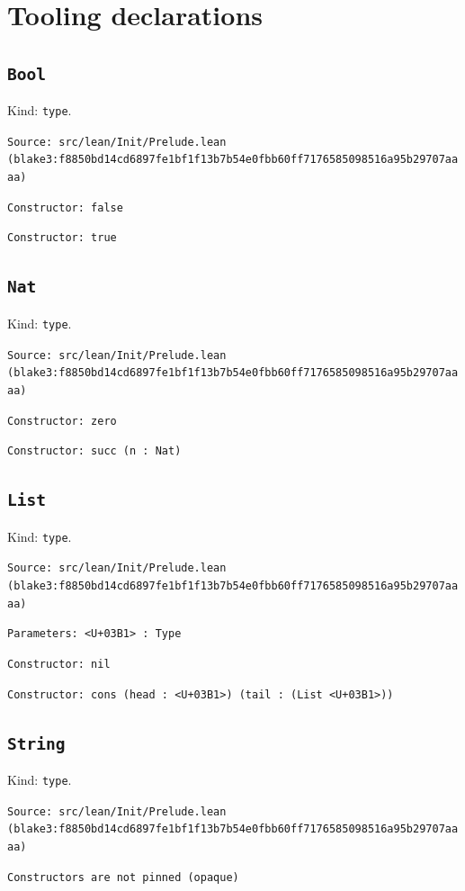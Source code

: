 \documentclass[11pt]{article}
\begin{document}
\section*{Tooling declarations}
\subsection*{\texttt{Bool}}
\noindent Kind: \texttt{type}.\par
\noindent \texttt{Source: src/lean/Init/Prelude.lean (blake3:f8850bd14cd6897fe1bf1f13b7b54e0fbb60ff7176585098516a95b29707aaaa)}\par
\noindent \texttt{Constructor: false }\par
\noindent \texttt{Constructor: true }\par
\subsection*{\texttt{Nat}}
\noindent Kind: \texttt{type}.\par
\noindent \texttt{Source: src/lean/Init/Prelude.lean (blake3:f8850bd14cd6897fe1bf1f13b7b54e0fbb60ff7176585098516a95b29707aaaa)}\par
\noindent \texttt{Constructor: zero }\par
\noindent \texttt{Constructor: succ (n : Nat)}\par
\subsection*{\texttt{List}}
\noindent Kind: \texttt{type}.\par
\noindent \texttt{Source: src/lean/Init/Prelude.lean (blake3:f8850bd14cd6897fe1bf1f13b7b54e0fbb60ff7176585098516a95b29707aaaa)}\par
\noindent \texttt{Parameters: <U+03B1> : Type}\par
\noindent \texttt{Constructor: nil }\par
\noindent \texttt{Constructor: cons (head : <U+03B1>) (tail : (List <U+03B1>))}\par
\subsection*{\texttt{String}}
\noindent Kind: \texttt{type}.\par
\noindent \texttt{Source: src/lean/Init/Prelude.lean (blake3:f8850bd14cd6897fe1bf1f13b7b54e0fbb60ff7176585098516a95b29707aaaa)}\par
\noindent \texttt{Constructors are not pinned (opaque)}\par
\end{document}
